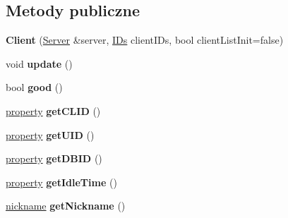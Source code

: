 \subsection*{Metody publiczne}
\begin{DoxyCompactItemize}
\item 
{\bfseries Client} (\hyperlink{class_ts3_api_1_1_server}{Server} \&server, \hyperlink{struct_ts3_api_1_1_client_1_1_i_ds}{I\+Ds} client\+I\+Ds, bool client\+List\+Init=false)\hypertarget{class_ts3_api_1_1_client_ad63f5acca38e884294bdf24883fac068}{}\label{class_ts3_api_1_1_client_ad63f5acca38e884294bdf24883fac068}

\item 
void {\bfseries update} ()\hypertarget{class_ts3_api_1_1_client_a6e7a5e19c40bef39ae1c0f5996b8c471}{}\label{class_ts3_api_1_1_client_a6e7a5e19c40bef39ae1c0f5996b8c471}

\item 
bool {\bfseries good} ()\hypertarget{class_ts3_api_1_1_client_a52f9b3ce0e014563b757afdd6fff4628}{}\label{class_ts3_api_1_1_client_a52f9b3ce0e014563b757afdd6fff4628}

\item 
\hyperlink{struct_ts3_api_1_1_client_1_1property}{property} {\bfseries get\+C\+L\+ID} ()\hypertarget{class_ts3_api_1_1_client_a72d6480e7f921ce9694dffeadab1b79a}{}\label{class_ts3_api_1_1_client_a72d6480e7f921ce9694dffeadab1b79a}

\item 
\hyperlink{struct_ts3_api_1_1_client_1_1property}{property} {\bfseries get\+U\+ID} ()\hypertarget{class_ts3_api_1_1_client_a4f145da31772f851628c0a87042c2942}{}\label{class_ts3_api_1_1_client_a4f145da31772f851628c0a87042c2942}

\item 
\hyperlink{struct_ts3_api_1_1_client_1_1property}{property} {\bfseries get\+D\+B\+ID} ()\hypertarget{class_ts3_api_1_1_client_a3854f5517090c0e8428b2de31aac878a}{}\label{class_ts3_api_1_1_client_a3854f5517090c0e8428b2de31aac878a}

\item 
\hyperlink{struct_ts3_api_1_1_client_1_1property}{property} {\bfseries get\+Idle\+Time} ()\hypertarget{class_ts3_api_1_1_client_a9e72f2d9a120491bb17e8b0871339852}{}\label{class_ts3_api_1_1_client_a9e72f2d9a120491bb17e8b0871339852}

\item 
\hyperlink{struct_ts3_api_1_1_client_1_1nickname}{nickname} {\bfseries get\+Nickname} ()\hypertarget{class_ts3_api_1_1_client_ab4ee104edd30af8926b01cc412c37c77}{}\label{class_ts3_api_1_1_client_ab4ee104edd30af8926b01cc412c37c77}


\end{DoxyCompactItemize}
